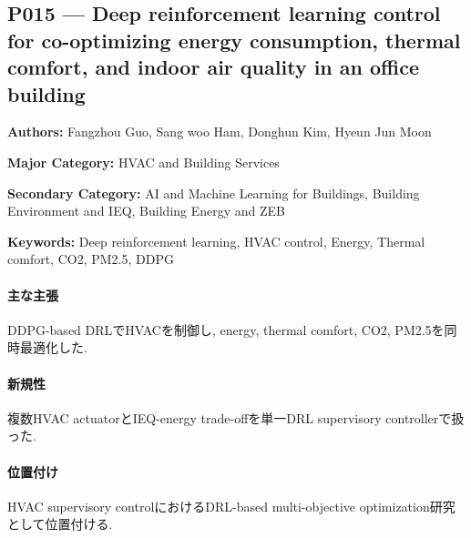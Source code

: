 \subsection{P015 --- Deep reinforcement learning control for co-optimizing energy consumption, thermal comfort, and indoor air quality in an office building}
\label{paper:P015}
\textbf{Authors:} Fangzhou Guo, Sang woo Ham, Donghun Kim, Hyeun Jun Moon\par
\textbf{Major Category:} HVAC and Building Services\par
\textbf{Secondary Category:} AI and Machine Learning for Buildings, Building Environment and IEQ, Building Energy and ZEB\par
\textbf{Keywords:} Deep reinforcement learning, HVAC control, Energy, Thermal comfort, CO2, PM2.5, DDPG\par
\paragraph{主な主張}
DDPG-based DRLでHVACを制御し, energy, thermal comfort, CO2, PM2.5を同時最適化した. \cite{Guo:2025DRLHVACIAQ}
\paragraph{新規性}
複数HVAC actuatorとIEQ-energy trade-offを単一DRL supervisory controllerで扱った.
\paragraph{位置付け}
HVAC supervisory controlにおけるDRL-based multi-objective optimization研究として位置付ける.
